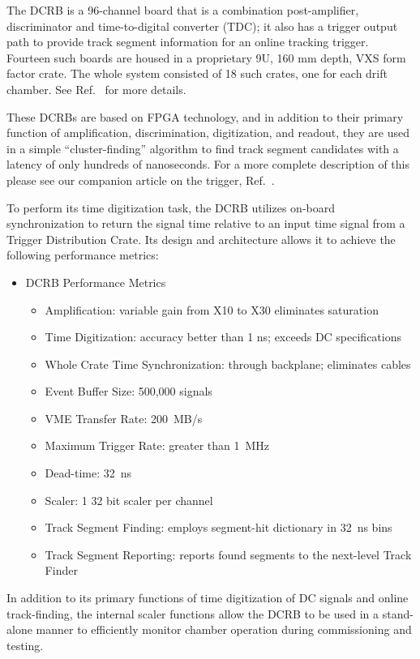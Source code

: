 The DCRB is a 96-channel board that is a combination post-amplifier,
discriminator and time-to-digital converter (TDC); it also has a trigger
output path to provide track segment information for an online tracking trigger.
Fourteen such boards are housed in
a proprietary 9U, 160 mm depth, VXS form factor crate.
The whole system consisted of 18 such crates, one for each drift chamber.
See Ref.~\cite{daq-nim} for more details.

These DCRBs are based on FPGA technology, and in addition to
their primary function of amplification, discrimination, digitization,
and readout, they are used in a simple ``cluster-finding'' algorithm
to find track segment candidates with a latency of only hundreds
of nanoseconds.  For a more complete description of this please
see our companion article on the trigger, Ref.~\cite{trigger-nim}.

To perform its time digitization task, the DCRB utilizes on-board synchronization to
return the signal time relative to an input time signal from  a Trigger Distribution
Crate. Its design and architecture
allows it to achieve the following performance metrics:
\begin{itemize}
\item DCRB Performance Metrics
\begin{itemize}
\item Amplification: variable gain from X10 to X30 eliminates saturation
\item Time Digitization: accuracy better than 1 ns; exceeds DC specifications
\item Whole Crate Time Synchronization: through backplane; eliminates cables
\item Event Buffer Size: 500,000 signals
\item VME Transfer Rate: 200~MB/s
\item Maximum Trigger Rate: greater than 1~MHz
\item Dead-time: 32~ns
\item Scaler: 1 32 bit scaler per channel
\item Track Segment Finding: employs segment-hit dictionary in 32~ns bins
\item Track Segment Reporting: reports found segments to the next-level Track Finder
\end{itemize}
\end{itemize}

In addition to its primary functions of time digitization of DC signals and online
track-finding, the internal scaler functions allow the DCRB to be used in 
a stand-alone manner to efficiently monitor chamber operation during commissioning
and testing.

